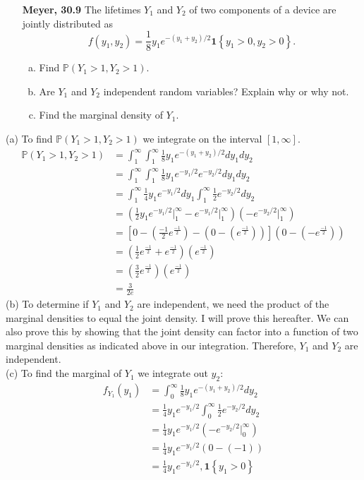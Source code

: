 \documentclass[11pt]{article}
\theoremstyle{definition}
\renewcommand{\P}{\mathbb{P}}
\newcommand{\1}[1]{\mathbf{1} \left \{ #1 \right \}}
\begin{document}
\begin{itemize}
\item [{\color{red} \textbf{Meyer, 30.9}}] The lifetimes $Y_1$ and $Y_2$ of two components of a device are jointly distributed as
\[
f(y_1, y_2) = \frac{1}{8} y_1 e^{-(y_1 + y_2)/2} \1{y_1 > 0, y_2 > 0}.
\]
\begin{enumerate}[(a)]
\item Find $\P(Y_1 > 1, Y_2 > 1)$.
\item Are $Y_1$ and $Y_2$ independent random variables? Explain why or why not.
\item Find the marginal density of $Y_1$.
\end{enumerate}
\end{itemize}
(a) To find $\P(Y_1 > 1, Y_2 > 1)$ we integrate on the interval $[1,\infty]$.
\begin{align*}
    \P(Y_1 > 1, Y_2 > 1) &= \int_1^{\infty} \int_1^{\infty} \frac{1}{8} y_1 e^{-(y_1 + y_2)/2} dy_1 dy_2 \\
    &= \int_1^{\infty} \int_1^{\infty} \frac{1}{8} y_1 e^{-y_1/2} e^{-y_2/2} dy_1 dy_2 \\
    &= \int_1^{\infty} \frac{1}{4} y_1 e^{-y_1/2} dy_1 \int_1^{\infty} \frac{1}{2} e^{-y_2/2} dy_2 \\
    &= \left(\frac{1}{2} y_1 e^{-y_1/2} \Big|_1^{\infty} - e^{-y_1/2} \Big|_1^{\infty}\right) \left(-e^{-y_2/2} \Big|_1^{\infty}\right) \\
    &= \left[0 - \left(\frac{-1}{2} e^{\frac{-1}{2}}\right) - \left(0 - \left(e^\frac{-1}{2}\right)\right)\right] \left(0 - \left(-e^\frac{-1}{2}\right)\right) \\
    &= \left(\frac{1}{2} e^{\frac{-1}{2}} + e^{\frac{-1}{2}}\right)\left(e^{\frac{-1}{2}}\right) \\
    &= \left(\frac{3}{2} e^{\frac{-1}{2}}\right)\left(e^{\frac{-1}{2}}\right) \\
    &= \frac{3}{2e}
\end{align*}
(b) To determine if $Y_1$ and $Y_2$ are independent, we need the product of the marginal densities to equal the joint density.  I will prove this hereafter.  We can also prove this by showing that the joint density can factor into a function of two marginal densities as indicated above in our integration.  Therefore, $Y_1$ and $Y_2$ are independent. \\
(c) To find the marginal of $Y_1$ we integrate out $y_2$:
\begin{align*}
    f_{Y_1} (y_1) &= \int_0^{\infty} \frac{1}{8} y_1 e^{-(y_1 + y_2)/2} dy_2 \\
    &= \frac{1}{4} y_1 e^{-y_1/2} \int_0^{\infty} \frac{1}{2} e^{-y_2/2} dy_2 \\
    &= \frac{1}{4} y_1 e^{-y_1/2} \left(-e^{-y_2/2} \Big|_0^{\infty} \right) \\
    &= \frac{1}{4} y_1 e^{-y_1/2} (0 - (-1)) \\
    &= \frac{1}{4} y_1 e^{-y_1/2}, \1{y_1 >0}
\end{align*}
\end{document}
